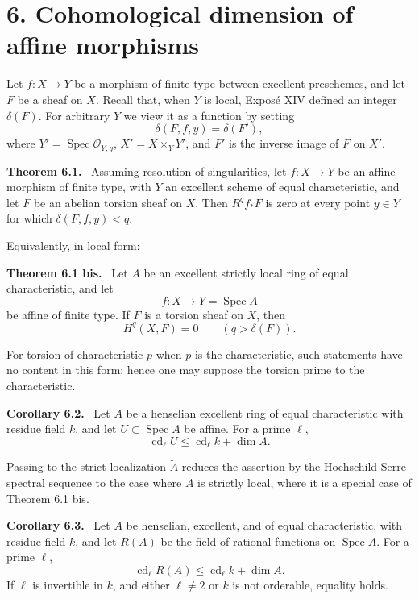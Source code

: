 \documentclass[12pt]{article}
\newcommand{\Oo}{\mathcal O}
\DeclareMathOperator{\Spec}{Spec}
\newenvironment{statement}[1]{\par\medskip\noindent\textbf{#1.}\ }{\par\medskip}
\begin{document}
\section*{6. Cohomological dimension of affine morphisms}

Let $f:X\to Y$ be a morphism of finite type between excellent preschemes, and let $F$ be a sheaf on $X$. Recall that, when $Y$ is local, Expos\'e XIV defined an integer $\delta(F)$. For arbitrary $Y$ we view it as a function by setting
\begin{equation}
   \delta(F,f,y)=\delta(F'), \tag{6.0}
\end{equation}
where $Y'=\Spec\Oo_{Y,y}$, $X'=X\times_YY'$, and $F'$ is the inverse image of $F$ on $X'$.

\begin{statement}{Theorem 6.1}
Assuming resolution of singularities, let $f:X\to Y$ be an affine morphism of finite type, with $Y$ an excellent scheme of equal characteristic, and let $F$ be an abelian torsion sheaf on $X$. Then $R^qf_*F$ is zero at every point $y\in Y$ for which $\delta(F,f,y)<q$.
\end{statement}

Equivalently, in local form:

\begin{statement}{Theorem 6.1 bis}
Let $A$ be an excellent strictly local ring of equal characteristic, and let
\[
   f:X\longrightarrow Y=\Spec A
\]
be affine of finite type. If $F$ is a torsion sheaf on $X$, then
\[
   H^q(X,F)=0\qquad(q>\delta(F)).
\]
\end{statement}

For torsion of characteristic $p$ when $p$ is the characteristic, such statements have no content in this form; hence one may suppose the torsion prime to the characteristic.

\begin{statement}{Corollary 6.2}
Let $A$ be a henselian excellent ring of equal characteristic with residue field $k$, and let $U\subset\Spec A$ be affine. For a prime $\ell$,
\[
   \operatorname{cd}_\ell U\leq \operatorname{cd}_\ell k+\dim A.
\]
\end{statement}

Passing to the strict localization $\widetilde A$ reduces the assertion by the Hochschild-Serre spectral sequence to the case where $A$ is strictly local, where it is a special case of Theorem 6.1 bis.

\begin{statement}{Corollary 6.3}
Let $A$ be henselian, excellent, and of equal characteristic, with residue field $k$, and let $R(A)$ be the field of rational functions on $\Spec A$. For a prime $\ell$,
\[
   \operatorname{cd}_\ell R(A)\leq \operatorname{cd}_\ell k+\dim A.
\]
If $\ell$ is invertible in $k$, and either $\ell\ne2$ or $k$ is not orderable, equality holds.
\end{statement}
\end{document}
